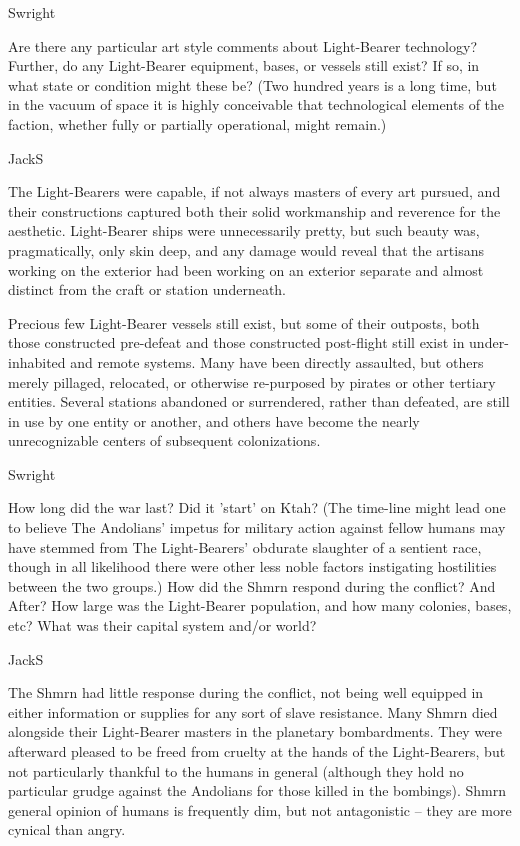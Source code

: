 Swright

Are there any particular art style comments about Light-Bearer
technology? Further, do any Light-Bearer equipment, bases, or vessels
still exist? If so, in what state or condition might these be? (Two
hundred years is a long time, but in the vacuum of space it is highly
conceivable that technological elements of the faction, whether fully
or partially operational, might remain.)

JackS

The Light-Bearers were capable, if not always masters of every art
pursued, and their constructions captured both their solid workmanship
and reverence for the aesthetic. Light-Bearer ships were unnecessarily
pretty, but such beauty was, pragmatically, only skin deep, and any
damage would reveal that the artisans working on the exterior had been
working on an exterior separate and almost distinct from the craft or
station underneath.

Precious few Light-Bearer vessels still exist, but some of their
outposts, both those constructed pre-defeat and those constructed
post-flight still exist in under-inhabited and remote systems. Many
have been directly assaulted, but others merely pillaged, relocated,
or otherwise re-purposed by pirates or other tertiary entities. Several
stations abandoned or surrendered, rather than defeated, are still in
use by one entity or another, and others have become the nearly
unrecognizable centers of subsequent colonizations.

Swright

How long did the war last? Did it 'start' on Ktah? (The time-line might
lead one to believe The Andolians' impetus for military action against
fellow humans may have stemmed from The Light-Bearers' obdurate
slaughter of a sentient race, though in all likelihood there were
other less noble factors instigating hostilities between the two
groups.) How did the Shmrn respond during the conflict? And After? How
large was the Light-Bearer population, and how many colonies, bases,
etc? What was their capital system and/or world?

JackS

The Shmrn had little response during the conflict, not being well
equipped in either information or supplies for any sort of slave
resistance. Many Shmrn died alongside their Light-Bearer masters in
the planetary bombardments. They were afterward pleased to be freed
from cruelty at the hands of the Light-Bearers, but not particularly
thankful to the humans in general (although they hold no particular
grudge against the Andolians for those killed in the bombings). Shmrn
general opinion of humans is frequently dim, but not antagonistic --
they are more cynical than angry.

